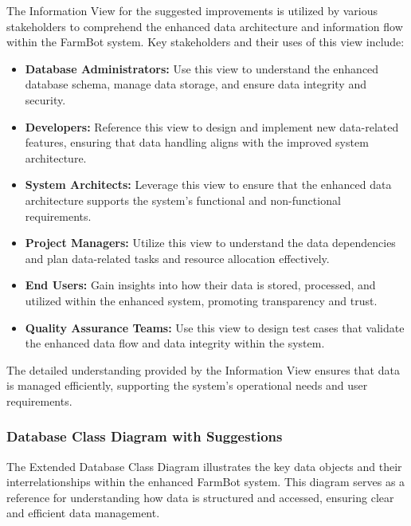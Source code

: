 The Information View for the suggested improvements is utilized by various stakeholders to comprehend the enhanced data architecture and information flow within the FarmBot system. Key stakeholders and their uses of this view include:

\begin{itemize}
    \item \textbf{Database Administrators:} Use this view to understand the enhanced database schema, manage data storage, and ensure data integrity and security.
    \item \textbf{Developers:} Reference this view to design and implement new data-related features, ensuring that data handling aligns with the improved system architecture.
    \item \textbf{System Architects:} Leverage this view to ensure that the enhanced data architecture supports the system's functional and non-functional requirements.
    \item \textbf{Project Managers:} Utilize this view to understand the data dependencies and plan data-related tasks and resource allocation effectively.
    \item \textbf{End Users:} Gain insights into how their data is stored, processed, and utilized within the enhanced system, promoting transparency and trust.
    \item \textbf{Quality Assurance Teams:} Use this view to design test cases that validate the enhanced data flow and data integrity within the system.
\end{itemize}

The detailed understanding provided by the Information View ensures that data is managed efficiently, supporting the system's operational needs and user requirements.

\subsubsection{Database Class Diagram with Suggestions}

The Extended Database Class Diagram illustrates the key data objects and their interrelationships within the enhanced FarmBot system. This diagram serves as a reference for understanding how data is structured and accessed, ensuring clear and efficient data management.

